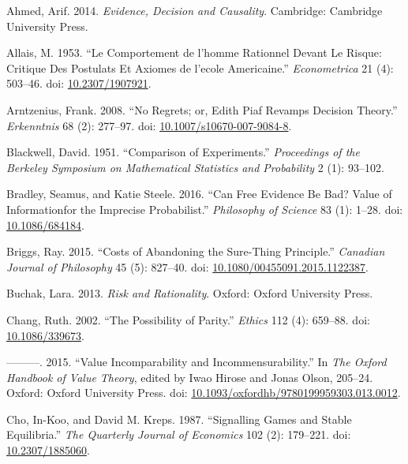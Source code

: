 \documentclass[
  10pt,
  letterpaper,
  DIV=11,
  numbers=noendperiod,
  twoside]{scrartcl}
\newlength{\cslhangindent}
\newenvironment{CSLReferences}[2] %
 {\begin{list}{}{%
  \setlength{\itemindent}{0pt}
  \setlength{\leftmargin}{0pt}
  \setlength{\parsep}{0pt}
  \ifodd #1
   \setlength{\leftmargin}{\cslhangindent}
   \setlength{\itemindent}{-1\cslhangindent}
  \fi
  \setlength{\itemsep}{#2\baselineskip}}}
 {\end{list}}
\begin{document}
\label{refs}
\begin{CSLReferences}{1}{0}
Ahmed, Arif. 2014. \emph{Evidence, Decision and Causality}. Cambridge:
{C}ambridge {U}niversity {P}ress.

Allais, M. 1953. {``Le Comportement de l'homme Rationnel Devant Le
Risque: Critique Des Postulats Et Axiomes de l'ecole Americaine.''}
\emph{Econometrica} 21 (4): 503--46. doi:
\href{https://doi.org/10.2307/1907921}{10.2307/1907921}.

Arntzenius, Frank. 2008. {``No Regrets; or, Edith Piaf Revamps Decision
Theory.''} \emph{Erkenntnis} 68 (2): 277--97. doi:
\href{https://doi.org/10.1007/s10670-007-9084-8}{10.1007/s10670-007-9084-8}.

Blackwell, David. 1951. {``Comparison of Experiments.''}
\emph{Proceedings of the Berkeley Symposium on Mathematical Statistics
and Probability} 2 (1): 93--102.

Bradley, Seamus, and Katie Steele. 2016. {``Can Free Evidence Be Bad?
Value of Informationfor the Imprecise Probabilist.''} \emph{Philosophy
of Science} 83 (1): 1--28. doi:
\href{https://doi.org/10.1086/684184}{10.1086/684184}.

Briggs, Ray. 2015. {``Costs of Abandoning the Sure-Thing Principle.''}
\emph{Canadian Journal of Philosophy} 45 (5): 827--40. doi:
\href{https://doi.org/10.1080/00455091.2015.1122387}{10.1080/00455091.2015.1122387}.

Buchak, Lara. 2013. \emph{Risk and Rationality}. Oxford: Oxford
University Press.

Chang, Ruth. 2002. {``The Possibility of Parity.''} \emph{Ethics} 112
(4): 659--88. doi:
\href{https://doi.org/10.1086/339673}{10.1086/339673}.

---------. 2015. {``Value Incomparability and Incommensurability.''} In
\emph{The Oxford Handbook of Value Theory}, edited by Iwao Hirose and
Jonas Olson, 205--24. Oxford: Oxford University Press. doi:
\href{https://doi.org/10.1093/oxfordhb/9780199959303.013.0012}{10.1093/oxfordhb/9780199959303.013.0012}.

Cho, In-Koo, and David M. Kreps. 1987. {``Signalling Games and Stable
Equilibria.''} \emph{The Quarterly Journal of Economics} 102 (2):
179--221. doi: \href{https://doi.org/10.2307/1885060}{10.2307/1885060}.


\end{CSLReferences}
\end{document}
